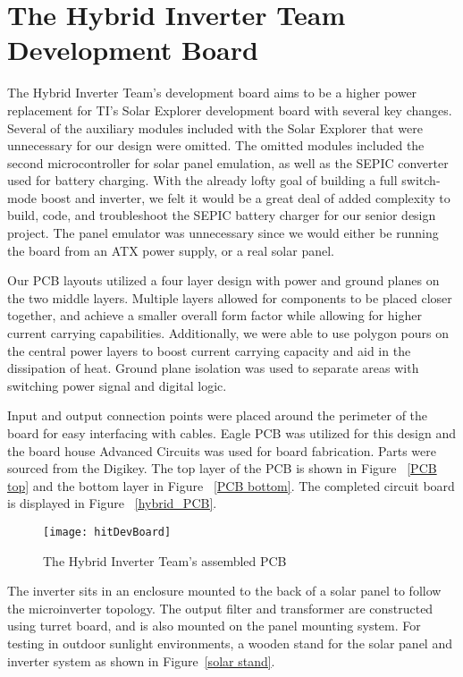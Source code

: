 \section{The Hybrid Inverter Team Development Board}
The Hybrid Inverter Team's development board aims to be a higher power replacement for TI's Solar Explorer development board with several key changes. Several of the auxiliary modules included with the Solar Explorer that were unnecessary for our design were omitted. The omitted modules included the second microcontroller for solar panel emulation, as well as the SEPIC converter used for battery charging. With the already lofty goal of building a full switch-mode boost and inverter, we felt it would be a great deal of added complexity to build, code, and troubleshoot the SEPIC battery charger for our senior design project. The panel emulator was unnecessary since we would either be running the board from an ATX power supply, or a real solar panel.

Our PCB layouts utilized a four layer design with power and ground planes on the two middle layers. Multiple layers allowed for components to be placed closer together, and achieve a smaller overall form factor while allowing for higher current carrying capabilities. Additionally, we were able to use polygon pours on the central power layers to boost current carrying capacity and aid in the dissipation of heat. Ground plane isolation was used to separate areas with switching power signal and digital logic.

Input and output connection points were placed around the perimeter of the board for easy interfacing with cables. Eagle PCB was utilized for this design and the board house Advanced Circuits was used for board fabrication. Parts were sourced from the Digikey. The top layer of the PCB is shown in Figure ~\ref{PCB top} and the bottom layer in Figure ~\ref{PCB bottom}. The completed circuit board is displayed in Figure ~\ref{hybrid_PCB}. 

\begin{figure}
\centering
\texttt{[image: hitDevBoard]}
\caption{The Hybrid Inverter Team's assembled PCB}
\label{The Hybrid Inverter Team's assembled PCB}
\end{figure}


The inverter sits in an enclosure mounted to the back of a solar panel to follow the microinverter topology. The output filter and transformer are constructed using turret board, and is also mounted on the panel mounting system. For testing in outdoor sunlight environments, a wooden stand for the solar panel and inverter system as shown in Figure~\ref{solar stand}.

